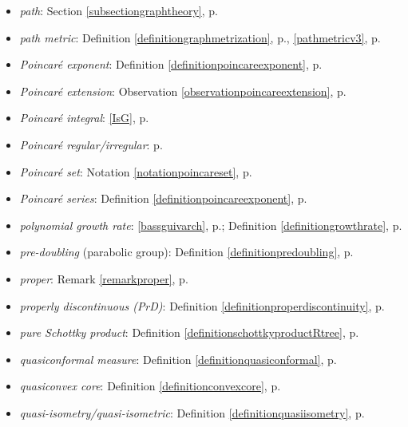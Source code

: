 \begin{itemize}
\item\emph{path}: Section \ref{subsectiongraphtheory}, p.\pageref{subsectiongraphtheory}
\item\emph{path metric}: Definition \ref{definitiongraphmetrization}, p.\pageref{definitiongraphmetrization}, \eqref{pathmetricv3}, p.\pageref{pathmetricv3}
\item\emph{Poincar\'e exponent}: Definition \ref{definitionpoincareexponent}, p.\pageref{definitionpoincareexponent}
\item\emph{Poincar\'e extension}: Observation \ref{observationpoincareextension}, p.\pageref{observationpoincareextension}
\item\emph{Poincar\'e integral}: \eqref{IsG}, p.\pageref{IsG}
\item\emph{Poincar\'e regular/irregular}: p.\pageref{corollarygeneralizedtypes}
\item\emph{Poincar\'e set}: Notation \ref{notationpoincareset}, p.\pageref{notationpoincareset}
\item\emph{Poincar\'e series}: Definition \ref{definitionpoincareexponent}, p.\pageref{definitionpoincareexponent}
\item\emph{polynomial growth rate}: \eqref{bassguivarch}, p.\pageref{bassguivarch}; Definition \ref{definitiongrowthrate}, p.\pageref{definitiongrowthrate}
\item\emph{pre-doubling} (parabolic group): Definition \ref{definitionpredoubling}, p.\pageref{definitionpredoubling}
\item\emph{proper}: Remark \ref{remarkproper}, p.\pageref{remarkproper}
\item\emph{properly discontinuous (PrD)}: Definition \ref{definitionproperdiscontinuity}, p.\pageref{definitionproperdiscontinuity}
\item\emph{pure Schottky product}: Definition \ref{definitionschottkyproductRtree}, p.\pageref{definitionschottkyproductRtree}
\item\emph{quasiconformal measure}: Definition \ref{definitionquasiconformal}, p.\pageref{definitionquasiconformal}
\item\emph{quasiconvex core}: Definition \ref{definitionconvexcore}, p.\pageref{definitionconvexcore}
\item\emph{quasi-isometry/quasi-isometric}: Definition \ref{definitionquasiisometry}, p.\pageref{definitionquasiisometry}

\end{itemize}
